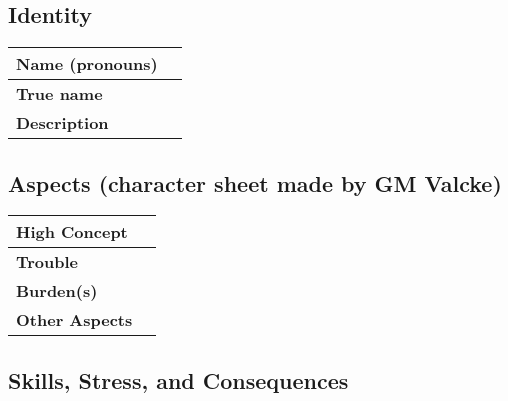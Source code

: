 \documentclass[12pt,a4paper]{article}
\newcommand{\MyTextField}[2][]{%
  \TextField[borderwidth=0,backgroundcolor={},#1]{#2}%
}
\begin{document}
\subsection*{Identity}
\begin{tabularx}{\linewidth}{|l|X|}
\hline
\textbf{Name (pronouns)} & \MyTextField[name=NamePronouns,width=\linewidth]{}\\ 
\hline
\textbf{True name} & \MyTextField[name=TrueName,width=\linewidth]{}\\ 
\hline
\textbf{Description} & \MyTextField[multiline=true,name=Description,width=\linewidth, height=2.5cm]{} \\ 
\hline
\end{tabularx}

\subsection*{Aspects  \color{white} (character sheet made by GM Valcke)}
\begin{tabularx}{\linewidth}{|l|X|}
\hline
\textbf{High Concept} & \MyTextField[name=HighConcept,width=\linewidth]{}\\ \hline
\textbf{Trouble} & \MyTextField[name=Trouble,width=\linewidth]{}\\ \hline
\textbf{Burden(s)} & \MyTextField[multiline=true,name=Burdens,width=\linewidth,height=1.5cm]{}\\ \hline
\textbf{Other Aspects} & \MyTextField[multiline=true,name=OtherAspects,width=\linewidth,height=2.7cm]{} \\ \hline
\end{tabularx}

\subsection*{Skills, Stress, and Consequences} %
\end{document}
